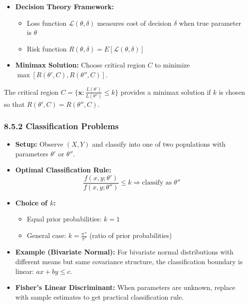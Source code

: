 \begin{itemize}
	\item \textbf{Decision Theory Framework:}
	\begin{itemize}
		\item Loss function $\mathcal{L}(\theta, \delta)$ measures cost of decision $\delta$ when true parameter is $\theta$
		\item Risk function $R(\theta, \delta) = E[\mathcal{L}(\theta, \delta)]$
	\end{itemize}
	\item \textbf{Minimax Solution:} Choose critical region $C$ to minimize $\max[R(\theta', C), R(\theta'', C)]$.
\end{itemize}

\begin{theorem}
The critical region $C = \{\mathbf{x}: \frac{L(\theta')}{L(\theta'')} \leq k\}$ provides a minimax solution if $k$ is chosen so that $R(\theta', C) = R(\theta'', C)$.
\end{theorem}
\subsubsection{8.5.2 Classification Problems}

\begin{itemize}
	\item \textbf{Setup:} Observe $(X, Y)$ and classify into one of two populations with parameters $\theta'$ or $\theta''$.
	\item \textbf{Optimal Classification Rule:}
\[
\frac{f(x, y; \theta')}{f(x, y; \theta'')} \leq k \Rightarrow \text{classify as } \theta''
\]
	\item \textbf{Choice of $k$:}
	\begin{itemize}
		\item Equal prior probabilities: $k = 1$
		\item General case: $k = \frac{\pi''}{\pi'}$ (ratio of prior probabilities)
	\end{itemize}
	\item \textbf{Example (Bivariate Normal):} For bivariate normal distributions with different means but same covariance structure, the classification boundary is linear: $ax + by \leq c$.
	\item \textbf{Fisher's Linear Discriminant:} When parameters are unknown, replace with sample estimates to get practical classification rule.
\end{itemize}

